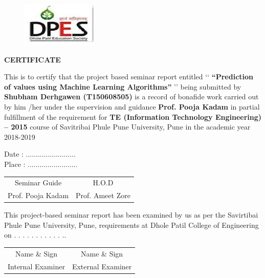 \documentclass[12pt,times,a4paper]{report}
\begin{document}
\begin{titlepage}
\begin{center} 
\begin{figure}[h]

\centerline{\includegraphics[scale=0.8]{logo1}}

\end{figure}


\vspace*{0.1in}
{\fontsize{16}{12}\textbf{{CERTIFICATE}} }\\
\begin{enumerate}
\vspace{0.3in}
This is to certify that the project based seminar report entitled \lq\lq \textbf{ “Prediction of values using Machine Learning Algorithms”}
 \rq\rq
being submitted by \textbf{ Shubham Derhgawen (T150608505)}  is a record of bonafide work carried out by him
/her under the supervision and guidance\textbf{ Prof. Pooja Kadam } in partial fulfillment of the
requirement for \textbf{ TE (Information Technology Engineering) – 2015} course of Savitribai Phule
Pune University, Pune in the academic year 2018-2019

\vspace*{0.3in}
Date  : .........................  \\ 
Place : .........................  \\ 
 
\vspace{0.8in}
\begin{table} [h]
\addtolength{\tabcolsep}{65pt}
\begin{tabular}{c                c  }
Seminar Guide  & H.O.D \\
 Prof. Pooja Kadam  & Prof. Ameet Zore 
\end{tabular}
\end{table}
\vspace{0.8in}

This project-based seminar report has been examined by us as per the Savirtibai Phule Pune
University, Pune, requirements at Dhole Patil College of Engineering on . . . . . . . . . . . ..
\begin{table} [h]
\addtolength{\tabcolsep}{65pt}
\begin{tabular}{c                c  }
Name \& Sign  & Name \& Sign \\
 Internal Examiner   & External Examiner 
\end{tabular}
\end{table}
\end{enumerate}
\end{center}

\end{titlepage}
\end{document}
